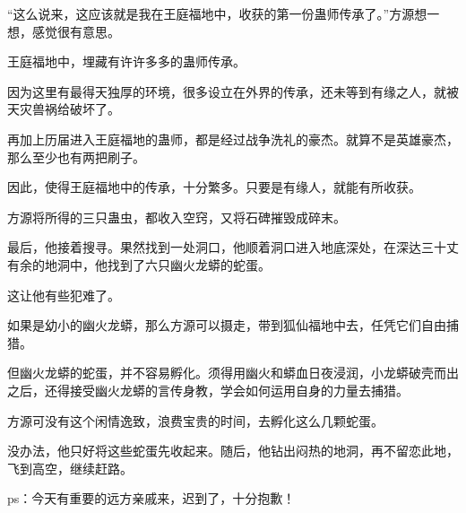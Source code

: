 \begin{this_body}
“这么说来，这应该就是我在王庭福地中，收获的第一份蛊师传承了。”方源想一想，感觉很有意思。

王庭福地中，埋藏有许许多多的蛊师传承。

因为这里有最得天独厚的环境，很多设立在外界的传承，还未等到有缘之人，就被天灾兽祸给破坏了。

再加上历届进入王庭福地的蛊师，都是经过战争洗礼的豪杰。就算不是英雄豪杰，那么至少也有两把刷子。

因此，使得王庭福地中的传承，十分繁多。只要是有缘人，就能有所收获。

方源将所得的三只蛊虫，都收入空窍，又将石碑摧毁成碎末。

最后，他接着搜寻。果然找到一处洞口，他顺着洞口进入地底深处，在深达三十丈有余的地洞中，他找到了六只幽火龙蟒的蛇蛋。

这让他有些犯难了。

如果是幼小的幽火龙蟒，那么方源可以摄走，带到狐仙福地中去，任凭它们自由捕猎。

但幽火龙蟒的蛇蛋，并不容易孵化。须得用幽火和蟒血日夜浸润，小龙蟒破壳而出之后，还得接受幽火龙蟒的言传身教，学会如何运用自身的力量去捕猎。

方源可没有这个闲情逸致，浪费宝贵的时间，去孵化这么几颗蛇蛋。

没办法，他只好将这些蛇蛋先收起来。随后，他钻出闷热的地洞，再不留恋此地，飞到高空，继续赶路。

ps：今天有重要的远方亲戚来，迟到了，十分抱歉！

\end{this_body}

